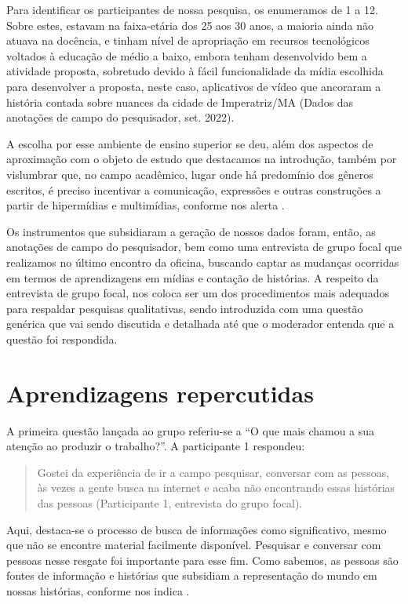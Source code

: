 \documentclass[portuguese]{textolivre}
\begin{document}
Para identificar os participantes de nossa pesquisa, os enumeramos de 1 a 12. Sobre estes, estavam na faixa-etária dos 25 aos 30 anos, a maioria ainda não atuava na docência, e tinham nível de apropriação em recursos tecnológicos voltados à educação de médio a baixo, embora tenham desenvolvido bem a atividade proposta, sobretudo devido à fácil funcionalidade da mídia escolhida para desenvolver a proposta, neste caso, aplicativos de vídeo que ancoraram a história contada sobre nuances da cidade de Imperatriz/MA (Dados das anotações de campo do pesquisador, set. 2022).

A escolha por esse ambiente de ensino superior se deu, além dos aspectos de aproximação com o objeto de estudo que destacamos na introdução, também por vislumbrar que, no campo acadêmico, lugar onde há predomínio dos gêneros escritos, é preciso incentivar a comunicação, expressões e outras construções a partir de hipermídias e multimídias, conforme nos alerta \textcite{cruz2016letramentos}.

Os instrumentos que subsidiaram a geração de nossos dados foram, então, as anotações de campo do pesquisador, bem como uma entrevista de grupo focal que realizamos no último encontro da oficina, buscando captar as mudanças ocorridas em termos de aprendizagens em mídias e contação de histórias. A respeito da entrevista de grupo focal, \textcite{gil2014metodos} nos coloca ser um dos procedimentos mais adequados para respaldar pesquisas qualitativas, sendo introduzida com uma questão genérica que vai sendo discutida e detalhada até que o moderador entenda que a questão foi respondida.


\section{Aprendizagens repercutidas}\label{sec-fmt-manuscrito}
A primeira questão lançada ao grupo referiu-se a “O que mais chamou a sua atenção ao produzir o trabalho?”. A participante 1 respondeu:

\begin{quote}
    Gostei da experiência de ir a campo pesquisar, conversar com as pessoas, às vezes a gente busca na internet e acaba não encontrando essas histórias das pessoas (Participante 1, entrevista do grupo focal).
\end{quote}

Aqui, destaca-se o processo de busca de informações como significativo, mesmo que não se encontre material facilmente disponível. Pesquisar e conversar com pessoas nesse resgate foi importante para esse fim. Como sabemos, as pessoas são fontes de informação e histórias que subsidiam a representação do mundo em nossas histórias, conforme nos indica \textcite{bruner1991construcao}.
\end{document}
